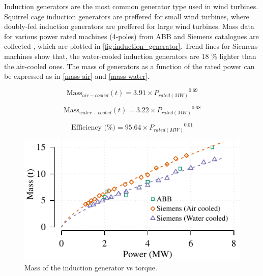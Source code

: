 \documentclass{article}\usepackage{graphicx, color}
\makeatletter
\def\maxwidth{ %
  \ifdim\Gin@nat@width>\linewidth
    \linewidth
  \else
    \Gin@nat@width
  \fi
}
\newenvironment{knitrout}{}{} %
\makeatother
\begin{document}
Induction generators are the most common generator type used in wind turbines. Squirrel cage induction generators are preffered for small wind turbines, where doubly-fed induction generators are preffered for large wind turbines. Mass data for various power rated machines (4-poles) from ABB and Siemens catalogues are collected \cite{ABB2012, Siemens}, which are plotted in \autoref{fig:induction_generator}. Trend lines for Siemens machines show that, the water-cooled induction generators are 18 \% lighter than the air-cooled ones. The mass of generators as a function of the rated power can be expressed as in \autoref{mass-air} and \autoref{mass-water}.


\begin{equation}
  \text{Mass}_{air-cooled}(t) = 3.91 \times {P_{rated(MW)}}^{0.69}
  \label{mass-air}
\end{equation}

\begin{equation}
  \text{Mass}_{water-cooled}(t) = 3.22 \times {P_{rated(MW)}}^{0.68}
  \label{mass-water}
\end{equation}

\begin{equation}
\text{Efficiency (\%)} = 95.64 \times {P_{rated(MW)}}^{0.01}
\end{equation}


\begin{knitrout}
\color{fgcolor}\begin{figure}[]

\includegraphics[width=\maxwidth]{figure/induction_generator} \caption[Mass of the induction generator vs torque]{Mass of the induction generator vs torque.\label{fig:induction_generator}}
\end{figure}


\end{knitrout}
\end{document}
